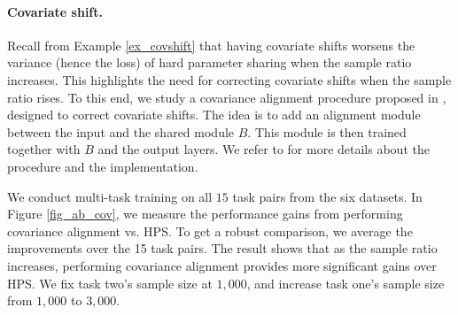 \paragraph{Covariate shift.}
Recall from Example \ref{ex_covshift} that having covariate shifts worsens the variance (hence the loss) of hard parameter sharing when the sample ratio increases.
This highlights the need for correcting covariate shifts when the sample ratio rises.
To this end, we study a covariance alignment procedure proposed in \citet{WZR20}, designed to correct covariate shifts.
The idea is to add an alignment module between the input and the shared module $B$.
This module is then trained together with $B$ and the output layers. We refer to \citet{WZR20} for more details about the procedure and the implementation.

We conduct multi-task training on all $15$ task pairs from the six datasets.
In Figure \ref{fig_ab_cov}, we measure the performance gains from performing covariance alignment vs. HPS.
To get a robust comparison, we average the improvements over the 15 task pairs.
The result shows that as the sample ratio increases, performing covariance alignment provides more significant gains over HPS.
We fix task two's sample size at $1,000$, and increase task one's sample size from $1,000$ to $3,000$.



